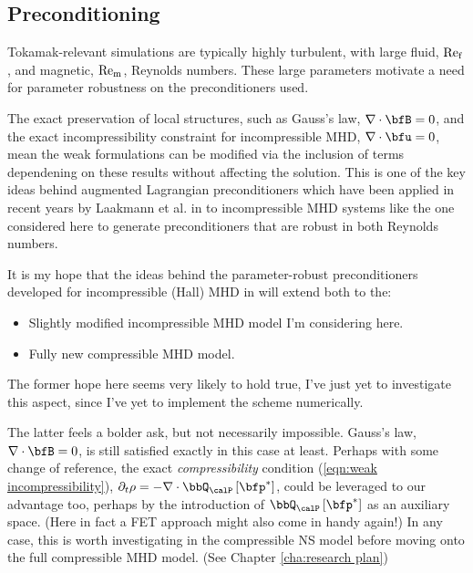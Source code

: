 \subsection*{Preconditioning}
    Tokamak-relevant simulations are typically highly turbulent, with large fluid, $\mathrm{Re}_{\mathrm{f}}$, and magnetic, $\mathrm{Re}_{\mathrm{m}}$, Reynolds numbers. These large parameters motivate a need for parameter robustness on the preconditioners used.

    The exact preservation of local structures, such as Gauss's law, $\nabla\cdot\bfB = 0$, and the exact incompressibility constraint for incompressible MHD, $\nabla\cdot\bfu = 0$, mean the weak formulations can be modified via the inclusion of terms dependening on these results without affecting the solution. This is one of the key ideas behind augmented Lagrangian preconditioners \cite{FMW19} which have been applied in recent years by Laakmann et al. in \cite{Laakmann_Farrell_Mitchell_22, Laakmann_Hu_Farrell_2022} to incompressible MHD systems like the one considered here to generate preconditioners that are robust in both Reynolds numbers.

    \begin{remark}
        It is my hope that the ideas behind the parameter-robust preconditioners developed for incompressible (Hall) MHD in \cite{Laakmann_Farrell_Mitchell_22, Laakmann_Hu_Farrell_2022} will extend both to the:
        \begin{itemize}
            \item  Slightly modified incompressible MHD model I'm considering here.
            \item  Fully new compressible MHD model.
        \end{itemize}
        
        The former hope here seems very likely to hold true, I've just yet to investigate this aspect, since I've yet to implement the scheme numerically.
        
        The latter feels a bolder ask, but not necessarily impossible. Gauss's law, $\nabla\cdot\bfB = 0$, is still satisfied exactly in this case at least. Perhaps with some change of reference, the exact \emph{compressibility} condition (\ref{eqn:weak incompressibility}), $\partial_{t}\rho  =  - \nabla\cdot\bbQ_{\calP}\left[\bfp^{*}\right]$, could be leveraged to our advantage too, perhaps by the introduction of $\bbQ_{\calP}\left[\bfp^{*}\right]$ as an auxiliary space. (Here in fact a FET approach might also come in handy again!) In any case, this is worth investigating in the compressible NS model before moving onto the full compressible MHD model. (See Chapter \ref{cha:research plan})
    \end{remark}
    